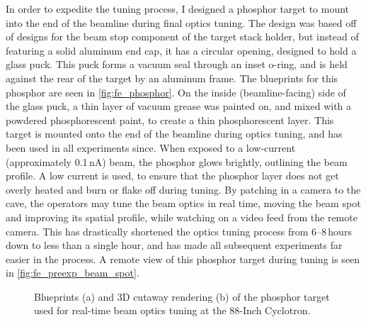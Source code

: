 In order to expedite the tuning process, I designed a phosphor target to mount into the end of the beamline during final optics tuning.
The design was based off of designs for the beam stop component of the target stack holder, but instead of featuring a solid aluminum end cap, it has a circular opening, designed to hold a glass puck.
This puck forms a vacuum seal through an inset o-ring, and is held against the rear of the target by an aluminum frame.
The blueprints for this phosphor are seen in \autoref{fig:fe_phosphor}.
On the inside (beamline-facing) side of the glass puck, a thin layer of vacuum grease was painted on, and mixed with a powdered phosphorescent paint, to create a thin phosphorescent layer.
This target is mounted onto the end of the beamline during optics tuning, and has been used in all experiments since.
When exposed to a low-current (approximately 0.1\,nA) beam, the phosphor glows brightly, outlining the beam profile.
A low current is used, to ensure that the phosphor layer does not get overly heated and burn or flake off during tuning.
By patching in a camera to the cave, the operators may tune the beam optics in real time, moving the beam spot and improving its spatial profile, while watching on a video feed from the remote camera.
This has drastically shortened the optics tuning process from 6--8\,hours down to less than a single hour, and has made all subsequent experiments far easier in the process.
A remote view of this phosphor target during tuning is seen in \autoref{fig:fe_preexp_beam_spot}.



\begin{figure}
    \centering
    \caption{Blueprints (a) and 3D cutaway rendering (b) of the phosphor target used for real-time beam optics tuning at the 88-Inch Cyclotron.} 
     \label{fig:fe_phosphor}
\end{figure}


